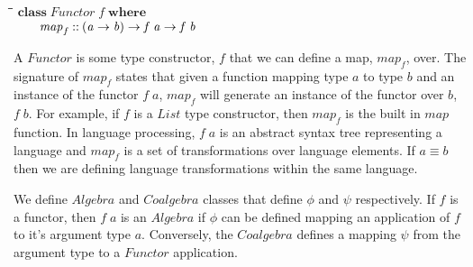 \documentclass[11pt]{article}
\newlength{\lwidth}\setlength{\lwidth}{4.5cm}
\newlength{\cwidth}\setlength{\cwidth}{8mm} %
\newcommand{\Conid}[1]{\mathit{#1}}
\newcommand{\Varid}[1]{\mathit{#1}}
\begin{document}
\begin{tabbing}
\qquad\=\hspace{\lwidth}\=\hspace{\cwidth}\=\+\kill
${\mathbf{class}\;\Conid{Functor}\;\Varid{f}\;\mathbf{where}}$\\
${\hskip2.00em\relax\Varid{map}_{f}\mathbin{::}(\Varid{a}\to \Varid{b})\to \Varid{f}\;\Varid{a}\to \Varid{f}\;\Varid{b}}$
\end{tabbing}
A \ensuremath{\Conid{Functor}} is some type constructor, \ensuremath{\Varid{f}} that we can define a map,
\ensuremath{\Varid{map}_{f}}, over.  The signature of \ensuremath{\Varid{map}_{f}} states that given a function
mapping type \ensuremath{\Varid{a}} to type \ensuremath{\Varid{b}} and an instance of the functor \ensuremath{\Varid{f}\;\Varid{a}},
\ensuremath{\Varid{map}_{f}} will generate an instance of the functor over \ensuremath{\Varid{b}}, \ensuremath{\Varid{f}\;\Varid{b}}.  For
example, if \ensuremath{\Varid{f}} is a \ensuremath{\Conid{List}} type constructor, then \ensuremath{\Varid{map}_{f}} is the built
in \ensuremath{\Varid{map}} function.  In language processing, \ensuremath{\Varid{f}\;\Varid{a}} is an abstract
syntax tree representing a language and \ensuremath{\Varid{map}_{f}} is a set of
transformations over language elements.  If \ensuremath{\Varid{a}\equiv \Varid{b}} then we are
defining language transformations within the same language.

We define \ensuremath{\Conid{Algebra}} and \ensuremath{\Conid{Coalgebra}} classes that define \ensuremath{\Varid{\phi}} and
\ensuremath{\Varid{\psi}} respectively.  If \ensuremath{\Varid{f}} is a functor, then \ensuremath{\Varid{f}\;\Varid{a}} is an \ensuremath{\Conid{Algebra}}
if \ensuremath{\Varid{\phi}} can be defined mapping an application of \ensuremath{\Varid{f}} to it's argument
type \ensuremath{\Varid{a}}.  Conversely, the \ensuremath{\Conid{Coalgebra}} defines a mapping \ensuremath{\Varid{\psi}} from
the argument type to a \ensuremath{\Conid{Functor}} application.
\end{document}
